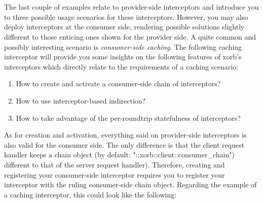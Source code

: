 \\\\
The last couple of examples relate to provider-side interceptors and introduce you to three possible usage scenarios for these interceptors. However, you may also deploy interceptors at the consumer side, rendering possible solutions slightly different to those enticing ones shown for the provider side. A quite common and possibly interesting scenario is \emph{consumer-side caching}.  The following caching interceptor will provide you some insights on the following features of xorb's interceptors which directly relate to the requirements of a caching scenario:
\begin{enumerate}
\item How to create and activate a consumer-side chain of interceptors?
\item How to use interceptor-based indirection?
\item How to take advantage of the per-roundtrip statefulness of interceptors?
\end{enumerate}
As for creation and activation, everything said on provider-side interceptors is also valid for the consumer side. The only difference is that the client request handler keeps a chain object (by default: "::xorb::client::consumer\_chain") different to that of the server request handler). Therefore, creating and registering your consumer-side interceptor requires you to register your interceptor with the ruling consumer-side chain object. Regarding the example of a caching interceptor, this could look like the following:
%
\lstset{breaklines=true,numbers=left,basicstyle=\footnotesize,frame=single}

%
